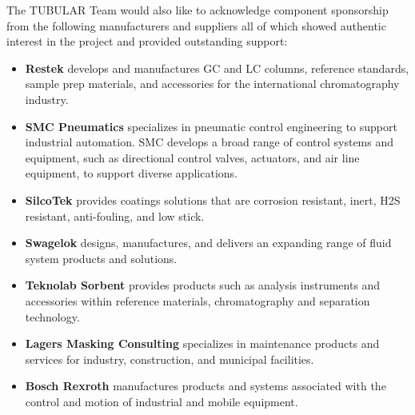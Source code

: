 The TUBULAR Team would also like to acknowledge component sponsorship from the following manufacturers and suppliers all of which showed authentic interest in the project and provided outstanding support:

\begin{itemize}
  \item \textbf{Restek} develops and manufactures GC and LC columns, reference standards, sample prep materials, and accessories for the international chromatography industry. 
  \item \textbf{SMC Pneumatics} specializes in pneumatic control engineering to support industrial automation. SMC develops a broad range of control systems and equipment, such as directional control valves, actuators, and air line equipment, to support diverse applications.
  \item \textbf{SilcoTek} provides coatings solutions that are corrosion resistant, inert, H2S resistant, anti-fouling, and low stick.
  \item \textbf{Swagelok} designs, manufactures, and delivers an expanding range of fluid system products and solutions.
  \item \textbf{Teknolab Sorbent} provides products such as  analysis instruments and accessories within reference materials, chromatography and separation technology.
  \item \textbf{Lagers Masking Consulting} specializes in maintenance products and services for industry, construction, and municipal facilities.
  \item \textbf{Bosch Rexroth} manufactures products and systems associated with the control and motion of industrial and mobile equipment.
\end{itemize}